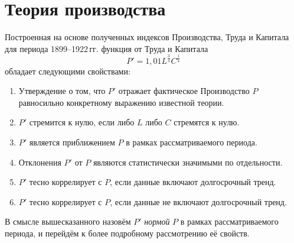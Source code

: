 \documentclass[leqno]{article}  %
\begin{document}
\section{Теория производства}

Построенная на основе полученных индексов Производства, Труда и Капитала для периода 1899--1922\,гг. функция от Труда и Капитала
\[P'=1,01L^{\frac34}C^{\frac14}\]
обладает следующими свойствами:
\begin{enumerate}[{1)}]
\item Утверждение о том, что \(P'\) отражает фактическое Производство \(P\) равносильно конкретному выражению известной теории.
\item \(P'\) стремится к нулю, если либо \(L\) либо \(C\) стремятся к нулю.
\item \(P'\) является приближением \(P\) в рамках рассматриваемого периода.
\item Отклонения \(P'\) от \(P\) являются статистически значимыми по отдельности.
\item \(P'\) тесно коррелирует с \(P\), если данные включают долгосрочный тренд.
\item \(P'\) тесно коррелирует с \(P\), если данные не включают долгосрочный тренд.
\end{enumerate}
В смысле вышесказанного назовём \(P'\) \emph{нормой} \(P\) в рамках рассматриваемого периода, и перейдём к более подробному рассмотрению её свойств.
\end{document}
